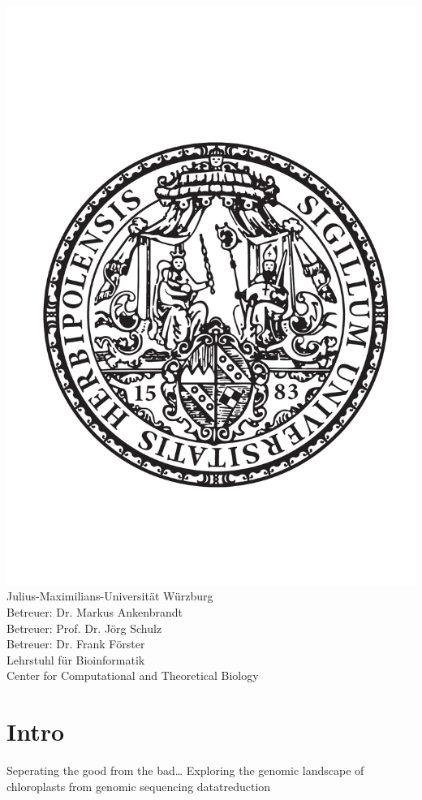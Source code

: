 \documentclass{scrartcl}
\begin{document}
\begin{center}
\includegraphics[width=.5\linewidth]{./neuSIEGEL.pdf}\\[1cm]
{\large Julius-Maximilians-Universität Würzburg}\\
{\large Betreuer: Dr. Markus Ankenbrandt}\\
{\large Betreuer: Prof. Dr. Jörg Schulz}\\
{\large Betreuer: Dr. Frank Förster}\\
{\large Lehrstuhl für Bioinformatik}\\
{\large Center for Computational and Theoretical Biology}
\setcounter{page}{1}
\clearpage
\end{center}
\tableofcontents
\clearpage
\section{Intro}
\label{sec-1}
Seperating the good from the bad\ldots{}
Exploring the genomic landscape of chloroplasts from genomic sequencing datatreduction
\end{document}
